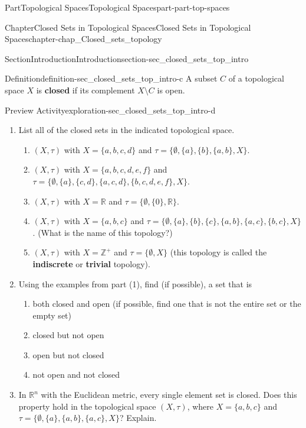 \documentclass[oneside,10pt,]{book}
\newcommand{\terminology}[1]{\textbf{#1}}
\numberwithin{equation}{chapter}
\newcommand{\Z}{\mathbb{Z}}
\newcommand{\R}{\mathbb{R}}
\begin{document}
\begin{partptx}{Part}{Topological Spaces}{}{Topological Spaces}{}{}{part-part-top-spaces}
\begin{chapterptx}{Chapter}{Closed Sets in Topological Spaces}{}{Closed Sets in Topological Spaces}{}{}{chapter-chap_Closed_sets_topology}
\begin{sectionptx}{Section}{Introduction}{}{Introduction}{}{}{section-sec_closed_sets_top_intro}
\begin{definition}{Definition}{}{definition-sec_closed_sets_top_intro-c}
%
A subset \(C\) of a topological space \(X\) is \terminology{closed} if its complement \(X \setminus C\) is open.%
\end{definition}
\begin{exploration}{Preview Activity}{}{exploration-sec_closed_sets_top_intro-d}%
\begin{enumerate}[font=\bfseries,label=(\alph*),ref=\alph*]%
\item{}List all of the closed sets in the indicated topological space.%
\begin{enumerate}[font=\bfseries,label=(\roman*),ref=\theenumi.\roman*]%
\item{}\((X, \tau)\) with \(X= \{a,b,c,d\}\) and \(\tau = \{\emptyset, \{a\}, \{b\}, \{a,b\}, X \}\).%
\item{}\((X, \tau)\) with \(X= \{a,b,c,d,e,f\}\) and \(\tau = \{\emptyset,\{a\}, \{c,d\}, \{a,c,d\}, \{b,c,d,e,f\}, X\}\).%
\item{}\((X, \tau)\) with \(X = \R\) and \(\tau = \{\emptyset, \{0\}, \R\}\).%
\item{}\((X, \tau)\) with \(X = \{a,b,c\}\) and \(\tau = \{\emptyset, \{a\}, \{b\},\{c\}, \{a,b\}, \{a,c\}, \{b,c\}, X \}\). (What is the name of this topology?)%
\item{}\((X, \tau)\) with \(X=\Z^+\) and \(\tau = \{\emptyset, X\}\) (this topology is called the \terminology{indiscrete} or \terminology{trivial} topology).%
\end{enumerate}%
\item{}Using the examples from part (1), find (if possible), a set that is%
\begin{enumerate}[font=\bfseries,label=(\roman*),ref=\theenumi.\roman*]%
\item{}both closed and open (if possible, find one that is not the entire set or the empty set)%
\item{}closed but not open%
\item{}open but not closed%
\item{}not open and not closed%
\end{enumerate}%
\item{}In \(\R^n\) with the Euclidean metric, every single element set is closed. Does this property hold in the topological space \((X, \tau)\), where \(X = \{a, b, c\}\) and \(\tau = \{\emptyset, \{a\}, \{a, b\}, \{a, c\}, X\}\)? Explain.%
\end{enumerate}%
\end{exploration}%
\end{sectionptx}

\end{chapterptx}
\end{partptx}
\end{document}

